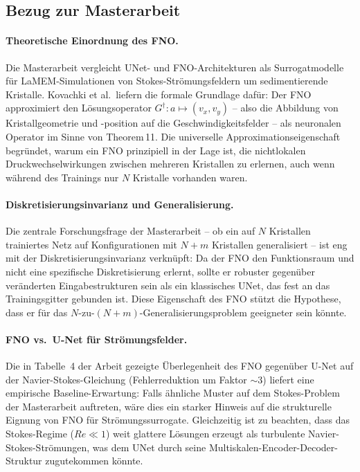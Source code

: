\documentclass[a4paper,12pt]{article}
\begin{document}
\subsection*{Bezug zur Masterarbeit}

\paragraph{Theoretische Einordnung des FNO.}
Die Masterarbeit vergleicht UNet- und FNO-Architekturen als Surrogatmodelle für
LaMEM-Simulationen von Stokes-Strömungsfeldern um sedimentierende Kristalle.
Kovachki et al.\ liefern die formale Grundlage dafür: Der FNO approximiert den
Lösungsoperator $G^\dagger: a \mapsto (v_x, v_y)$ -- also die Abbildung von
Kristallgeometrie und -position auf die Geschwindigkeitsfelder -- als neuronalen
Operator im Sinne von Theorem\,11. Die universelle Approximationseigenschaft
begründet, warum ein FNO prinzipiell in der Lage ist, die nichtlokalen
Druckwechselwirkungen zwischen mehreren Kristallen zu erlernen, auch wenn während
des Trainings nur $N$ Kristalle vorhanden waren.

\paragraph{Diskretisierungsinvarianz und Generalisierung.}
Die zentrale Forschungsfrage der Masterarbeit -- ob ein auf $N$ Kristallen
trainiertes Netz auf Konfigurationen mit $N{+}m$ Kristallen generalisiert --
ist eng mit der Diskretisierungsinvarianz verknüpft: Da der FNO den
Funktionsraum und nicht eine spezifische Diskretisierung erlernt, sollte er
robuster gegenüber veränderten Eingabestrukturen sein als ein klassisches UNet,
das fest an das Trainingsgitter gebunden ist. Diese Eigenschaft des FNO stützt
die Hypothese, dass er für das $N$-zu-$(N{+}m)$-Generalisierungsproblem
geeigneter sein könnte.

\paragraph{FNO vs.\ U-Net für Strömungsfelder.}
Die in Tabelle~4 der Arbeit gezeigte Überlegenheit des FNO gegenüber U-Net
auf der Navier-Stokes-Gleichung (Fehlerreduktion um Faktor ${\sim}3$) liefert
eine empirische Baseline-Erwartung: Falls ähnliche Muster auf dem Stokes-Problem
der Masterarbeit auftreten, wäre dies ein starker Hinweis auf die strukturelle
Eignung von FNO für Strömungssurrogate. Gleichzeitig ist zu beachten, dass das
Stokes-Regime ($Re \ll 1$) weit glattere Lösungen erzeugt als turbulente
Navier-Stokes-Strömungen, was dem UNet durch seine Multiskalen-Encoder-Decoder-
Struktur zugutekommen könnte.
\end{document}
